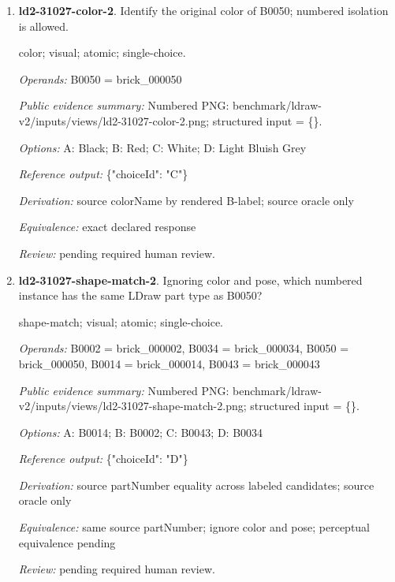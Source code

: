 \begin{enumerate}
\par{\small distance; source-data; atomic; single-choice.\par\textit{Operands:} B0036 = brick\_000036, B0045 = brick\_000045, B0051 = brick\_000051, B0040 = brick\_000040\par\textit{Public evidence summary:} \{"coordinateFrame": "Viewer world, millimeters, Euclidean distance", "centers": \{"B0045": [12, 9.52, 12], "B0040": [12, 9.600012, -8], "B0051": [12, -2.4, -31.2], "B0036": [8, 8.8, 0]\}\}\par\textit{Options:} A: B0051; B: B0040; C: B0036\par\textit{Reference output:} \{"choiceId": "C"\}\par\textit{Derivation:} Euclidean norm from public rounded centers\par\textit{Equivalence:} exact declared response\par\textit{Review:} machine checks passed; no human certification.}
\item \textbf{ld2-31027-color-2}. Identify the original color of B0050; numbered isolation is allowed.
\par{\small color; visual; atomic; single-choice.\par\textit{Operands:} B0050 = brick\_000050\par\textit{Public evidence summary:} Numbered PNG: benchmark/ldraw-v2/inputs/views/ld2-31027-color-2.png; structured input = \{\}.\par\textit{Options:} A: Black; B: Red; C: White; D: Light Bluish Grey\par\textit{Reference output:} \{"choiceId": "C"\}\par\textit{Derivation:} source colorName by rendered B-label; source oracle only\par\textit{Equivalence:} exact declared response\par\textit{Review:} pending required human review.}
\item \textbf{ld2-31027-shape-match-2}. Ignoring color and pose, which numbered instance has the same LDraw part type as B0050?
\par{\small shape-match; visual; atomic; single-choice.\par\textit{Operands:} B0002 = brick\_000002, B0034 = brick\_000034, B0050 = brick\_000050, B0014 = brick\_000014, B0043 = brick\_000043\par\textit{Public evidence summary:} Numbered PNG: benchmark/ldraw-v2/inputs/views/ld2-31027-shape-match-2.png; structured input = \{\}.\par\textit{Options:} A: B0014; B: B0002; C: B0043; D: B0034\par\textit{Reference output:} \{"choiceId": "D"\}\par\textit{Derivation:} source partNumber equality across labeled candidates; source oracle only\par\textit{Equivalence:} same source partNumber; ignore color and pose; perceptual equivalence pending\par\textit{Review:} pending required human review.}

\end{enumerate}
